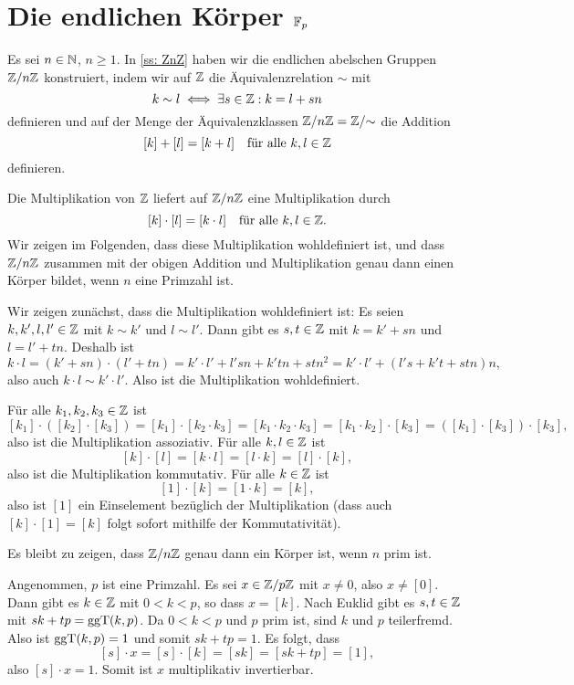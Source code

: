 \section{Die endlichen Körper \texorpdfstring{$\mathbb{F}_p$}{Fp}}
Es sei $n \in \mathbb{N}$, $n \geq 1$. In \ref{ss: ZnZ} haben wir die endlichen abelschen Gruppen $\mathbb{Z}/n\mathbb{Z}$ konstruiert, indem wir auf $\mathbb{Z}$ die Äquivalenzrelation $\sim$ mit
\[
 k \sim l \iff \exists s \in \mathbb{Z} : k = l + sn
\]
definieren und auf der Menge der Äquivalenzklassen $\mathbb{Z}/n\mathbb{Z} = \mathbb{Z}/{\sim}$ die Addition
\[
 [k] + [l] = [k+l]
 \quad
 \text{für alle $k,l \in \mathbb{Z}$}
\]
definieren.

Die Multiplikation von $\mathbb{Z}$ liefert auf $\mathbb{Z}/n\mathbb{Z}$ eine Multiplikation durch
\[
 [k] \cdot [l] = [k \cdot l]
 \quad
 \text{für alle $k,l \in \mathbb{Z}$}.
\]
Wir zeigen im Folgenden, dass diese Multiplikation wohldefiniert ist, und dass $\mathbb{Z}/n\mathbb{Z}$ zusammen mit der obigen Addition und Multiplikation genau dann einen Körper bildet, wenn $n$ eine Primzahl ist.

Wir zeigen zunächst, dass die Multiplikation wohldefiniert ist: Es seien $k, k', l, l' \in \mathbb{Z}$ mit $k \sim k'$ und $l \sim l'$. Dann gibt es $s,t \in \mathbb{Z}$ mit $k = k' + sn$ und $l = l' + tn$. Deshalb ist
\[
 k \cdot l
 = (k' + sn) \cdot (l' + tn)
 = k' \cdot l' + l'sn + k'tn + stn^2
 = k' \cdot l' + (l's + k't + stn)n,
\]
also auch $k \cdot l \sim k' \cdot l'$. Also ist die Multiplikation wohldefiniert.

Für alle $k_1, k_2, k_3 \in \mathbb{Z}$ ist
\[
 [k_1] \cdot ([k_2] \cdot [k_3])
 = [k_1] \cdot [k_2 \cdot k_3]
 = [k_1 \cdot k_2 \cdot k_3]
 = [k_1 \cdot k_2] \cdot [k_3]
 = ([k_1] \cdot [k_3]) \cdot [k_3],
\]
also ist die Multiplikation assoziativ. Für alle $k, l \in \mathbb{Z}$ ist
\[
 [k] \cdot [l]
 = [k \cdot l]
 = [l \cdot k]
 = [l] \cdot [k],
\]
also ist die Multiplikation kommutativ. Für alle $k \in \mathbb{Z}$ ist
\[
 [1] \cdot [k] = [1 \cdot k] = [k],
\]
also ist $[1]$ ein Einselement bezüglich der Multiplikation (dass auch $[k] \cdot [1] = [k]$ folgt sofort mithilfe der Kommutativität).

Es bleibt zu zeigen, dass $\mathbb{Z}/n\mathbb{Z}$ genau dann ein Körper ist, wenn $n$ prim ist.

Angenommen, $p$ ist eine Primzahl. Es sei $x \in \mathbb{Z}/p\mathbb{Z}$ mit $x \neq 0$, also $x \neq [0]$. Dann gibt es $k \in \mathbb{Z}$ mit $0 < k < p$, so dass $x = [k]$. Nach Euklid gibt es $s,t \in \mathbb{Z}$ mit $sk + tp = \mathrm{ggT}(k,p)$. Da $0 < k < p$ und $p$ prim ist, sind $k$ und $p$ teilerfremd. Also ist $\mathrm{ggT}(k,p) = 1$ und somit $sk + tp = 1$. Es folgt, dass
\[
 [s] \cdot x
 = [s] \cdot [k]
 = [sk]
 = [sk + tp]
 = [1],
\]
also $[s] \cdot x = 1$. Somit ist $x$ multiplikativ invertierbar.

